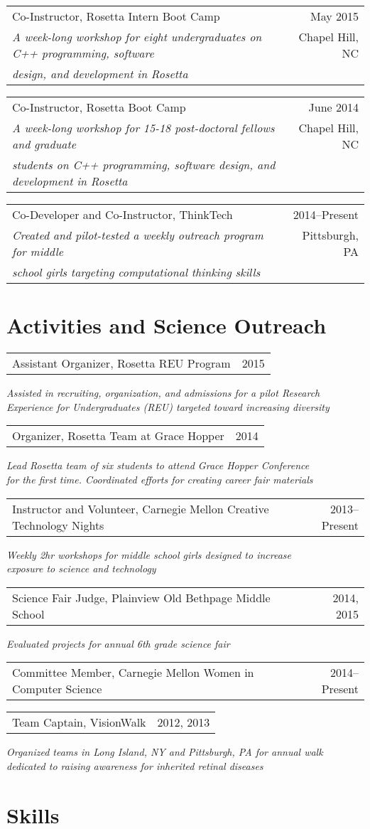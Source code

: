 \documentclass[12pt]{article}
\makeatletter
\newcommand{\allcapsspacing}[1]{{\addfontfeature{LetterSpace=7.5}#1}}
\newcommand{\threerowstwocolsitem}[5]{
\noindent
\begin{tabular*}{\textwidth}{@{\extracolsep{\fill}}lr}
		#1 & #2 \\
		#3 & #4 \\
		#5 & \\
\end{tabular*}\vspace{0.75\baselineskip}}
\newcommand{\longteachingitem}[5]{
\threerowstwocolsitem{#1}{#2}{\textit{#3}}{#5}{\textit{#4}}}
\newcommand{\leadershipitem}[3]{
\noindent
\begin{tabular*}{\textwidth}{@{\extracolsep{\fill}}lr}
		#1 & #2 \\
\end{tabular*}\newline\textit{#3}\vspace{0.75\baselineskip}\par}
\newcommand{\yearitem}[2]{
\noindent
\begin{tabular*}{\textwidth}{@{\extracolsep{\fill}}lr}
		#1 & #2 \\
\end{tabular*}\vspace{0.75\baselineskip}\par}
\makeatother
\begin{document}
\longteachingitem{Co-Instructor, Rosetta Intern Boot Camp}{May 2015}{A week-long workshop for eight undergraduates on C++ programming, software }{design, and development in Rosetta}{Chapel Hill, NC}

\longteachingitem{Co-Instructor, Rosetta Boot Camp}{June 2014}{A week-long workshop for 15-18 post-doctoral fellows and graduate}{students on C++ programming, software design, and development in Rosetta}{Chapel Hill, NC}

\longteachingitem{Co-Developer and Co-Instructor, ThinkTech}{2014--Present}{Created and pilot-tested a weekly outreach program for middle}{school girls targeting computational thinking skills}{Pittsburgh, PA}

\section*{\allcapsspacing{Activities and Science Outreach}}
\leadershipitem{Assistant Organizer, Rosetta REU Program}{2015}{Assisted in recruiting, organization, and admissions for a pilot Research \\ Experience for Undergraduates (REU) targeted toward increasing diversity}

\leadershipitem{Organizer, Rosetta Team at Grace Hopper}{2014}{Lead Rosetta team of six students to attend Grace Hopper Conference \\ for the first time. Coordinated efforts for creating career fair materials}

\leadershipitem{Instructor and Volunteer, Carnegie Mellon Creative Technology Nights}{2013--Present}{Weekly 2hr workshops for middle school girls designed to increase \\ exposure to science and technology}

\leadershipitem{Science Fair Judge, Plainview Old Bethpage Middle School}{2014, 2015}{Evaluated projects for annual 6th grade science fair}

\yearitem{Committee Member, Carnegie Mellon Women in Computer Science}{2014--Present}

\leadershipitem{Team Captain, VisionWalk}{2012, 2013}{Organized teams in Long Island, NY and Pittsburgh, PA for annual walk \\ dedicated to raising awareness for inherited retinal diseases}

\section*{\allcapsspacing{Skills}}
\end{document}

